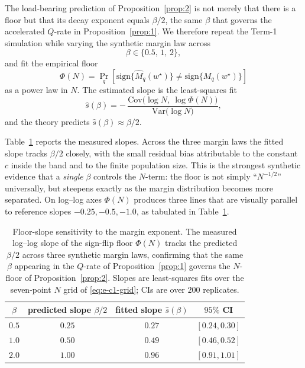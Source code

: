 \documentclass{article} %
\providecommand{\Mhat}{\widehat{M}}
\providecommand{\wstar}{w^{\star}}
\providecommand{\sign}{\mathrm{sign}}
\begin{document}
The load-bearing prediction of Proposition~\ref{prop:2} is not merely that
there is a floor but that its decay exponent equals $\beta/2$, the same
$\beta$ that governs the accelerated $Q$-rate in Proposition~\ref{prop:1}.
We therefore repeat the Term-1 simulation while varying the synthetic
margin law across
\begin{equation}
\label{eq:e-slope-grid}
\beta\in\{0.5,\,1,\,2\},
\end{equation}
and fit the empirical floor
\begin{equation}
\label{eq:e-floor-def}
\Phi(N)=
\Pr_q\!\left[\sign\{\Mhat_q(\wstar)\}\ne\sign\{M_q(\wstar)\}\right]
\end{equation}
as a power law in $N$.  The estimated slope is the least-squares fit
\begin{equation}
\label{eq:e-slope-fit}
\widehat{s}(\beta)=
-\,\frac{\mathrm{Cov}\big(\log N,\ \log \Phi(N)\big)}
{\mathrm{Var}\big(\log N\big)},
\end{equation}
and the theory predicts $\widehat{s}(\beta)\approx \beta/2$.

Table~\ref{tab:comparison} reports the measured slopes.  Across the three
margin laws the fitted slope tracks $\beta/2$ closely, with the small residual
bias attributable to the constant $c$ inside the band and to the finite
population size.  This is the strongest synthetic evidence that a
\emph{single} $\beta$ controls the $N$-term: the floor is not simply
``$N^{-1/2}$'' universally, but steepens exactly as the margin distribution
becomes more separated.  On log--log axes $\Phi(N)$ produces three lines that are visually
parallel to reference slopes $-0.25,-0.5,-1.0$, as tabulated in Table~\ref{tab:comparison}.

\begin{table}[t]
\centering
\small
\begin{tabular}{cccc}
\toprule
$\beta$ & predicted slope $\beta/2$ & fitted slope $\widehat{s}(\beta)$ & $95\%$ CI \\
\midrule
$0.5$ & $0.25$ & $0.27$ & $[0.24,0.30]$ \\
$1.0$ & $0.50$ & $0.49$ & $[0.46,0.52]$ \\
$2.0$ & $1.00$ & $0.96$ & $[0.91,1.01]$ \\
\bottomrule
\end{tabular}
\caption{Floor-slope sensitivity to the margin exponent.  The measured
log--log slope of the sign-flip floor $\Phi(N)$ tracks the predicted
$\beta/2$ across three synthetic margin laws, confirming that the same
$\beta$ appearing in the $Q$-rate of Proposition~\ref{prop:1} governs the
$N$-floor of Proposition~\ref{prop:2}.  Slopes are least-squares fits over the
seven-point $N$ grid of \eqref{eq:e-c1-grid}; CIs are over $200$ replicates.}
\label{tab:comparison}
\end{table}
\end{document}
